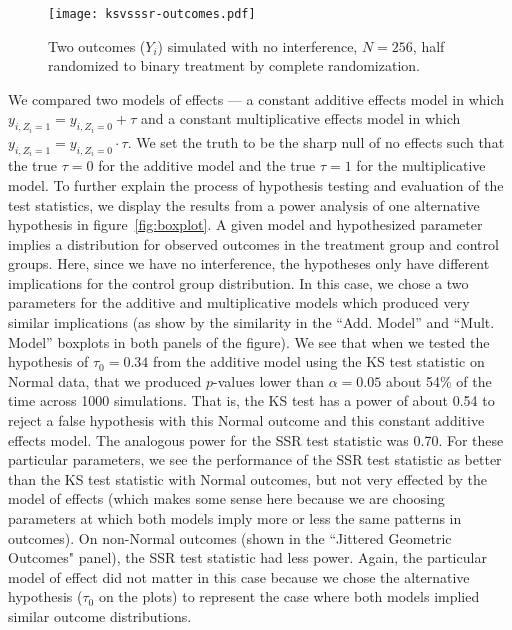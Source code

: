 \begin{figure}[H]\centering
  \texttt{[image: ksvsssr-outcomes.pdf]}
  \caption{Two outcomes ($Y_i$) simulated with no interference, $N=256$, half
    randomized to binary treatment by complete randomization. }\label{fig:simpleoutcomes}
\end{figure}

We compared two models of effects --- a constant additive effects model in
which $y_{i,Z_i=1}=y_{i,Z_i=0}+\tau$ and a constant multiplicative effects
model in which $y_{i,Z_i=1}=y_{i,Z_i=0} \cdot \tau$. We set the truth to be
the sharp null of no effects such that the true $\tau=0$ for the additive
model and the true $\tau=1$ for the multiplicative model. To further explain
the process of hypothesis testing and evaluation of the test statistics, we
display the results from a power analysis of one alternative hypothesis in
figure~\ref{fig:boxplot}. A given model and hypothesized parameter implies a
distribution for observed outcomes in the treatment group and control groups.
Here, since we have no interference, the hypotheses only have different
implications for the control group distribution. In this case, we chose a two
parameters for the additive and multiplicative models which produced very
similar implications (as show by the similarity in the ``Add. Model'' and
``Mult.  Model'' boxplots in both panels of the figure). We see that when we
tested the hypothesis of $\tau_0=0.34$ from the additive model using the KS
test statistic on Normal data, that we produced $p$-values lower than
$\alpha=0.05$ about 54\% of the time across 1000 simulations. That is, the KS
test has a power of about 0.54 to reject a false hypothesis with this Normal
outcome and this constant additive effects model. The analogous power for the
SSR test statistic was 0.70. For these particular parameters, we see the
performance of the SSR test statistic as better than the KS test statistic
with Normal outcomes, but not very effected by the
model of effects (which makes some sense here because we are choosing
parameters at which both models imply more or less the same patterns in
outcomes). On non-Normal outcomes (shown in the ``Jittered Geometric Outcomes"
panel), the SSR test statistic had less power. Again, the particular model of
effect did not matter in this case because we chose the alternative hypothesis
($\tau_0$ on the plots) to represent the case where both models implied
similar outcome distributions.

